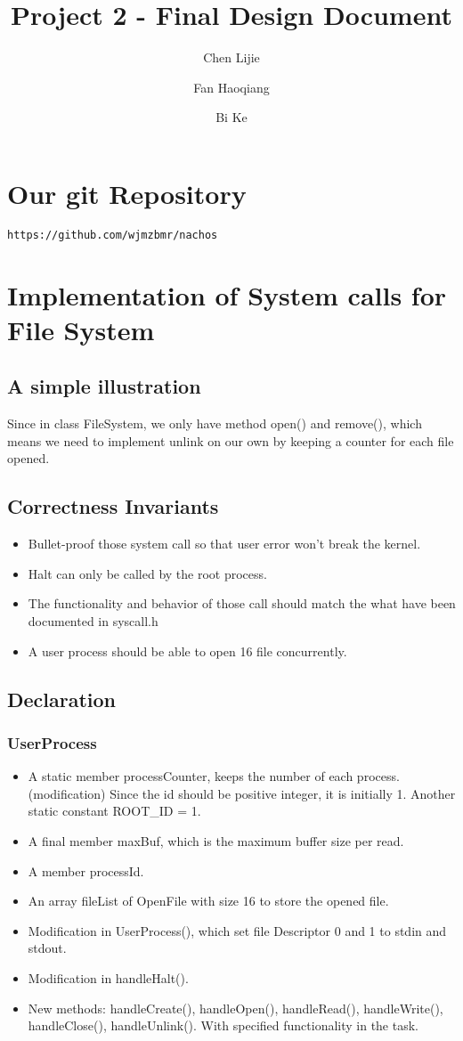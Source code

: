 \documentclass{article}
\title{Project 2 - Final Design Document}
\author{Chen Lijie\\ \and
	Fan Haoqiang\\ \and
	Bi Ke\\ }
\date{}
\begin{document}
	\maketitle
	\section{Our git Repository}
	\texttt{https://github.com/wjmzbmr/nachos}
	\section{Implementation of System calls for File System}
	\subsection{A simple illustration}
	Since in class FileSystem, we only have method open() and remove(), which means we need to implement unlink on our own by keeping a counter for each file opened.
	\subsection{Correctness Invariants}
	\begin{itemize}
		\item Bullet-proof those system call so that user error won't break the kernel.
		\item Halt can only be called by the root process.
		\item The functionality and behavior of those call should match the what have been documented in syscall.h
		\item A user process should be able to open 16 file concurrently.
	\end{itemize}
	\subsection{Declaration}
	\subsubsection*{UserProcess}
	\begin{itemize}
		\item A static member processCounter, keeps the number of each process. (modification) Since the id should be positive integer, it is initially 1. Another static constant ROOT\_ID = 1.
		\item A final member maxBuf, which is the maximum buffer size per read.
		\item A member processId.
		\item An array fileList of OpenFile with size 16 to store the opened file.
		\item Modification in UserProcess(), which set file Descriptor 0 and 1 to stdin and stdout.
		\item Modification in handleHalt().
		\item New methods: handleCreate(), handleOpen(), handleRead(), handleWrite(), handleClose(), handleUnlink(). With specified functionality in the task.
	\end{itemize}
\end{document}
